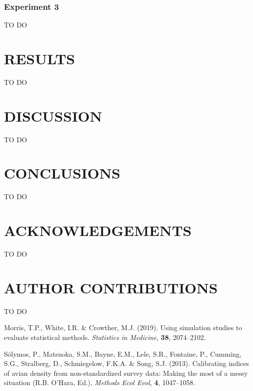 \documentclass[
  11pt,
]{article}
\begin{document}
\hypertarget{experiment-3}{%
\subsubsection{Experiment 3}\label{experiment-3}}

TO DO

\clearpage

\hypertarget{results}{%
\section{RESULTS}\label{results}}

TO DO

\clearpage

\hypertarget{discussion}{%
\section{DISCUSSION}\label{discussion}}

TO DO

\clearpage

\hypertarget{conclusions}{%
\section{CONCLUSIONS}\label{conclusions}}

TO DO

\clearpage

\hypertarget{acknowledgements}{%
\section{ACKNOWLEDGEMENTS}\label{acknowledgements}}

TO DO

\hypertarget{author-contributions}{%
\section{AUTHOR CONTRIBUTIONS}\label{author-contributions}}

TO DO

\hypertarget{refs}{}
\leavevmode\hypertarget{ref-morris_using_2019}{}%
Morris, T.P., White, I.R. \& Crowther, M.J. (2019). Using simulation
studies to evaluate statistical methods. \emph{Statistics in Medicine},
\textbf{38}, 2074--2102.

\leavevmode\hypertarget{ref-solymos_calibrating_2013}{}%
Sólymos, P., Matsuoka, S.M., Bayne, E.M., Lele, S.R., Fontaine, P.,
Cumming, S.G., Stralberg, D., Schmiegelow, F.K.A. \& Song, S.J. (2013).
Calibrating indices of avian density from non-standardized survey data:
Making the most of a messy situation (R.B. O'Hara, Ed.). \emph{Methods
Ecol Evol}, \textbf{4}, 1047--1058.
\end{document}
